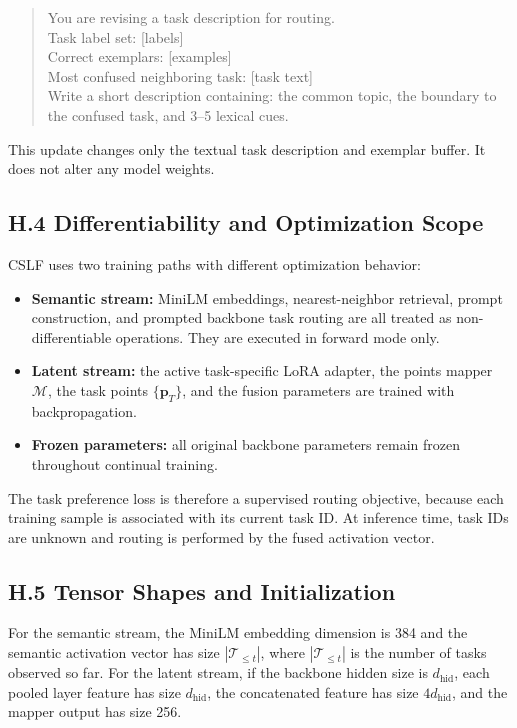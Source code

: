 \documentclass[11pt]{article}
\begin{document}
\begin{quote}
You are revising a task description for routing.\\
Task label set: [labels]\\
Correct exemplars: [examples]\\
Most confused neighboring task: [task text]\\
Write a short description containing: the common topic, the boundary to the confused task, and 3--5 lexical cues.
\end{quote}

This update changes only the textual task description and exemplar buffer. It does not alter any model weights.

\subsection*{H.4 Differentiability and Optimization Scope}

CSLF uses two training paths with different optimization behavior:
\begin{itemize}
    \item \textbf{Semantic stream:} MiniLM embeddings, nearest-neighbor retrieval, prompt construction, and prompted backbone task routing are all treated as non-differentiable operations. They are executed in forward mode only.
    \item \textbf{Latent stream:} the active task-specific LoRA adapter, the points mapper $\mathcal{M}$, the task points $\{\mathbf{p}_T\}$, and the fusion parameters are trained with backpropagation.
    \item \textbf{Frozen parameters:} all original backbone parameters remain frozen throughout continual training.
\end{itemize}

The task preference loss is therefore a supervised routing objective, because each training sample is associated with its current task ID. At inference time, task IDs are unknown and routing is performed by the fused activation vector.

\subsection*{H.5 Tensor Shapes and Initialization}

For the semantic stream, the MiniLM embedding dimension is 384 and the semantic activation vector has size $|\mathcal{T}_{\le t}|$, where $|\mathcal{T}_{\le t}|$ is the number of tasks observed so far. For the latent stream, if the backbone hidden size is $d_{\text{hid}}$, each pooled layer feature has size $d_{\text{hid}}$, the concatenated feature has size $4d_{\text{hid}}$, and the mapper output has size 256.
\end{document}
